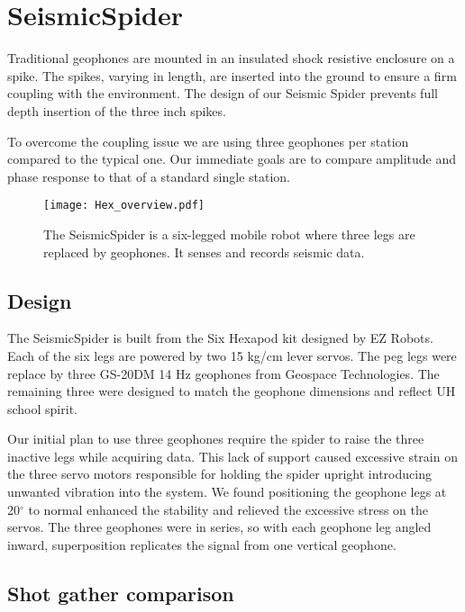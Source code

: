 \section{SeismicSpider}\label{sec:SeismicSpider}

Traditional geophones are mounted in an insulated shock resistive enclosure on a spike. The spikes, varying in length, are inserted into the ground to ensure a firm coupling with the environment. The design of our Seismic Spider prevents full depth insertion of the three inch spikes. 

	To overcome the coupling issue we are using three geophones per station compared to the typical one. Our immediate goals are to compare amplitude and phase response to that of a standard single station.	

\begin{figure} \centering
  {\texttt{[image: Hex\_overview.pdf]}}
 \caption{The SeismicSpider is a six-legged mobile robot where three legs are replaced by geophones. It senses and records seismic data.} 
 \label{fig:TradvsAutoDrop}
\end{figure}
\subsection{Design}

The SeismicSpider is built from the Six Hexapod kit designed by EZ Robots. Each of the six legs are powered by two 15 kg/cm lever servos. The peg legs were replace by three GS-20DM 14 Hz geophones from Geospace Technologies. The remaining three were designed to match the geophone dimensions and reflect UH school spirit.

 Our initial plan to use three geophones require the spider to raise the three inactive legs while acquiring data. This lack of support caused excessive strain on the three servo motors responsible for holding the spider upright introducing unwanted vibration into the system. We found positioning the geophone legs at 20$^\circ$ to normal enhanced the stability and relieved the excessive stress on the servos. 
 The three geophones were in series, so with each geophone leg angled inward, superposition replicates the signal from one vertical geophone.

\subsection{Shot gather comparison}

